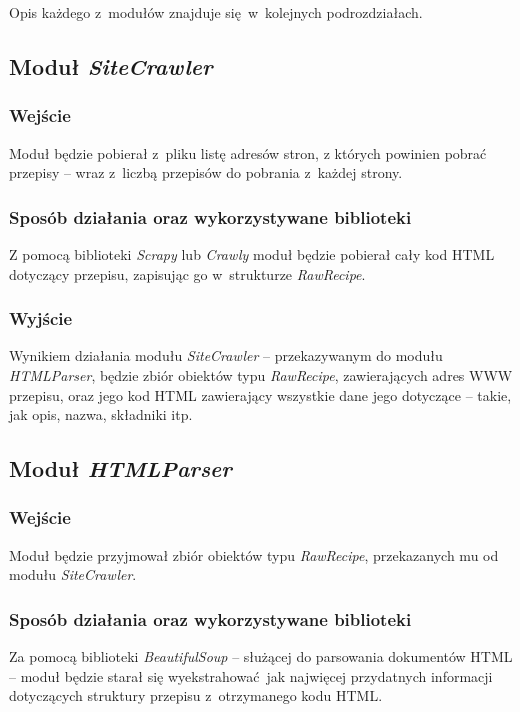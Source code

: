 \documentclass[11pt,a4paper]{article}
\begin{document}
Opis każdego z~modułów znajduje się w~kolejnych podrozdziałach.

\subsection{Moduł \textit{SiteCrawler}}
\subsubsection{Wejście}
Moduł będzie pobierał z~pliku listę adresów stron, z których powinien pobrać przepisy -- wraz z~liczbą przepisów do pobrania z~każdej strony.
\subsubsection{Sposób działania oraz wykorzystywane biblioteki}
Z pomocą biblioteki \textit{Scrapy} lub \textit{Crawly} moduł będzie pobierał cały kod HTML dotyczący przepisu, zapisując go w~strukturze \textit{RawRecipe}.
\subsubsection{Wyjście}
Wynikiem działania modułu \textit{SiteCrawler} -- przekazywanym do modułu \textit{HTMLParser}, będzie zbiór obiektów typu \textit{RawRecipe}, zawierających adres WWW przepisu, oraz jego kod HTML zawierający wszystkie dane jego dotyczące -- takie, jak opis, nazwa, składniki itp.

\subsection{Moduł \textit{HTMLParser}}
\subsubsection{Wejście}
Moduł będzie przyjmował zbiór obiektów typu \textit{RawRecipe}, przekazanych mu od modułu \textit{SiteCrawler}.
\subsubsection{Sposób działania oraz wykorzystywane biblioteki}
Za pomocą biblioteki \textit{BeautifulSoup} -- służącej do parsowania dokumentów HTML -- moduł będzie starał się wyekstrahować jak najwięcej przydatnych informacji dotyczących struktury przepisu z~otrzymanego kodu HTML.
\end{document}
